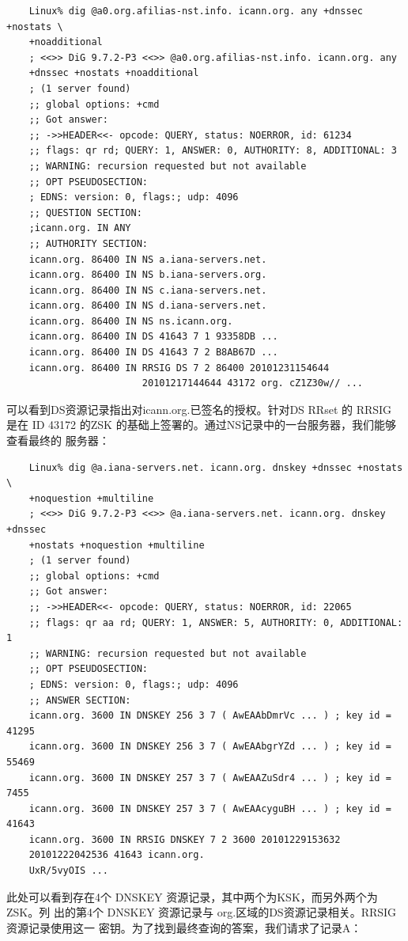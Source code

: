 \begin{verbatim}
    Linux% dig @a0.org.afilias-nst.info. icann.org. any +dnssec +nostats \
    +noadditional
    ; <<>> DiG 9.7.2-P3 <<>> @a0.org.afilias-nst.info. icann.org. any
    +dnssec +nostats +noadditional
    ; (1 server found)
    ;; global options: +cmd
    ;; Got answer:
    ;; ->>HEADER<<- opcode: QUERY, status: NOERROR, id: 61234
    ;; flags: qr rd; QUERY: 1, ANSWER: 0, AUTHORITY: 8, ADDITIONAL: 3
    ;; WARNING: recursion requested but not available
    ;; OPT PSEUDOSECTION:
    ; EDNS: version: 0, flags:; udp: 4096
    ;; QUESTION SECTION:
    ;icann.org. IN ANY
    ;; AUTHORITY SECTION:
    icann.org. 86400 IN NS a.iana-servers.net.
    icann.org. 86400 IN NS b.iana-servers.org.
    icann.org. 86400 IN NS c.iana-servers.net.
    icann.org. 86400 IN NS d.iana-servers.net.
    icann.org. 86400 IN NS ns.icann.org.
    icann.org. 86400 IN DS 41643 7 1 93358DB ...
    icann.org. 86400 IN DS 41643 7 2 B8AB67D ...
    icann.org. 86400 IN RRSIG DS 7 2 86400 20101231154644
                        20101217144644 43172 org. cZ1Z30w// ...
\end{verbatim}
可以看到DS资源记录指出对icann.org.已签名的授权。针对DS RRset 的 RRSIG 是在
ID 43172 的ZSK 的基础上签署的。通过NS记录中的一台服务器，我们能够查看最终的
服务器：
\begin{verbatim}
    Linux% dig @a.iana-servers.net. icann.org. dnskey +dnssec +nostats \
    +noquestion +multiline
    ; <<>> DiG 9.7.2-P3 <<>> @a.iana-servers.net. icann.org. dnskey +dnssec
    +nostats +noquestion +multiline
    ; (1 server found)
    ;; global options: +cmd
    ;; Got answer:
    ;; ->>HEADER<<- opcode: QUERY, status: NOERROR, id: 22065
    ;; flags: qr aa rd; QUERY: 1, ANSWER: 5, AUTHORITY: 0, ADDITIONAL: 1
    ;; WARNING: recursion requested but not available
    ;; OPT PSEUDOSECTION:
    ; EDNS: version: 0, flags:; udp: 4096
    ;; ANSWER SECTION:
    icann.org. 3600 IN DNSKEY 256 3 7 ( AwEAAbDmrVc ... ) ; key id = 41295
    icann.org. 3600 IN DNSKEY 256 3 7 ( AwEAAbgrYZd ... ) ; key id = 55469
    icann.org. 3600 IN DNSKEY 257 3 7 ( AwEAAZuSdr4 ... ) ; key id = 7455
    icann.org. 3600 IN DNSKEY 257 3 7 ( AwEAAcyguBH ... ) ; key id = 41643
    icann.org. 3600 IN RRSIG DNSKEY 7 2 3600 20101229153632
    20101222042536 41643 icann.org.
    UxR/5vyOIS ...
\end{verbatim}
此处可以看到存在4个 DNSKEY 资源记录，其中两个为KSK，而另外两个为ZSK。列
出的第4个 DNSKEY 资源记录与 org.区域的DS资源记录相关。RRSIG 资源记录使用这一
密钥。为了找到最终查询的答案，我们请求了记录A：
